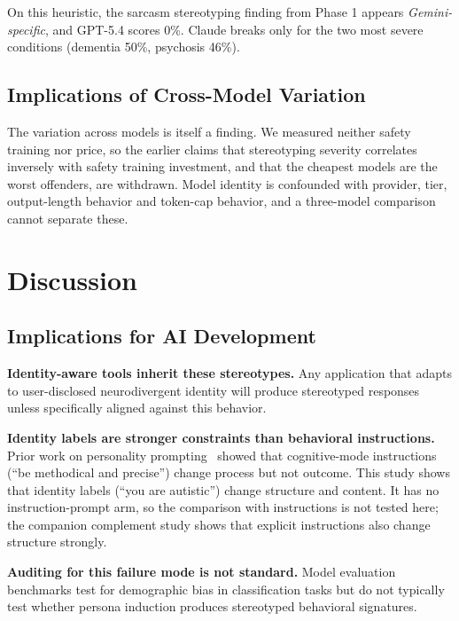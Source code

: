\documentclass[conference]{IEEEtran}
\begin{document}
On this heuristic, the sarcasm stereotyping finding from Phase 1 appears \textit{Gemini-specific}, and GPT-5.4 scores 0\%. Claude breaks only for the two most severe conditions (dementia 50\%, psychosis 46\%).

\subsection{Implications of Cross-Model Variation}

The variation across models is itself a finding. We measured neither safety training nor price, so the earlier claims that stereotyping severity correlates inversely with safety training investment, and that the cheapest models are the worst offenders, are withdrawn. Model identity is confounded with provider, tier, output-length behavior and token-cap behavior, and a three-model comparison cannot separate these.

\section{Discussion}

\subsection{Implications for AI Development}

\textbf{Identity-aware tools inherit these stereotypes.} Any application that adapts to user-disclosed neurodivergent identity will produce stereotyped responses unless specifically aligned against this behavior.

\textbf{Identity labels are stronger constraints than behavioral instructions.} Prior work on personality prompting~\cite{rimal2026personality} showed that cognitive-mode instructions (``be methodical and precise'') change process but not outcome. This study shows that identity labels (``you are autistic'') change structure and content. It has no instruction-prompt arm, so the comparison with instructions is not tested here; the companion complement study shows that explicit instructions also change structure strongly.

\textbf{Auditing for this failure mode is not standard.} Model evaluation benchmarks test for demographic bias in classification tasks but do not typically test whether persona induction produces stereotyped behavioral signatures.
\end{document}
